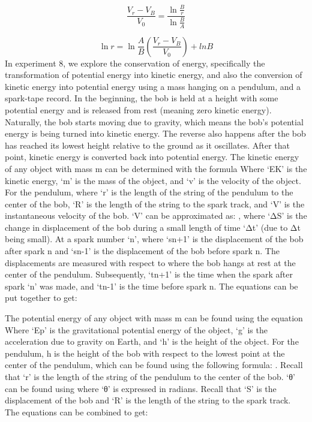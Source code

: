 \documentclass[letterpaper]{article}
\begin{document}
\begin{equation}
  \frac{V_r-V_B}{V_0}=\frac{\ln{\frac{B}{r}}}{\ln{\frac{B}{A}}}
\end{equation}

\begin{equation}
  \ln{r} =\ln{\frac{A}{B}}(\frac{V_r-V_B}{V_0}) + ln{B}
\end{equation}
In experiment 8, we explore the conservation of energy, specifically the transformation of potential energy into kinetic energy, and also the conversion of kinetic energy into potential energy using a mass hanging on a pendulum, and a spark-tape record. In the beginning, the bob is held at a height with some potential energy and is released from rest (meaning zero kinetic energy). Naturally, the bob starts moving due to gravity, which means the bob’s potential energy is being turned into kinetic energy. The reverse also happens after the bob has reached its lowest height relative to the ground as it oscillates. After that point, kinetic energy is converted back into potential energy.
The kinetic energy of any object with mass m can be determined with the formula
Where ‘EK’ is the kinetic energy, ‘m’ is the mass of the object, and ‘v’ is the velocity of the object.
For the pendulum,  where ‘r’ is the length of the string of the pendulum to the center of the bob, ‘R’ is the length of the string to the spark track, and ‘V’ is the instantaneous velocity of the bob. ‘V’ can be approximated as: , where ‘ΔS’ is the change in displacement of the bob during a small length of time ‘Δt’ (due to Δt being small). At a spark number ‘n’,  where ‘sn+1’ is the displacement of the bob after spark n and ‘sn-1’ is the displacement of the bob before spark n.  The displacements are measured with respect to where the bob hangs at rest at the center of the pendulum. Subsequently, ‘tn+1’ is the time when the spark after spark ‘n’ was made, and ‘tn-1’ is the time before spark n. The equations can be put together to get:



The potential energy of any object with mass m can be found using the equation
Where ‘Ep’ is the gravitational potential energy of the object, ‘g’ is the acceleration due to gravity on Earth, and ‘h’ is the height of the object. For the pendulum, h is the height of the bob with respect to the lowest point at the center of the pendulum, which can be found using the following formula:
. Recall that ‘r’ is the length of the string of the pendulum to the center of the bob. ‘θ’ can be found using  where ‘θ’ is expressed in radians. Recall that ‘S’ is the displacement of the bob and ‘R’ is the length of the string to the spark track.  The equations can be combined to get:
\end{document}
